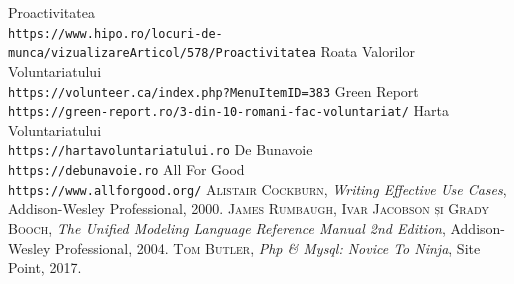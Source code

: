 \documentclass[12pt,a4paper]{report}
\begin{document}
\begin{thebibliography}{1}
Proactivitatea
\\\texttt{https://www.hipo.ro/locuri-de-munca/vizualizareArticol/578/Proactivitatea}
Roata Valorilor Voluntariatului
\\\texttt{https://volunteer.ca/index.php?MenuItemID=383}
Green Report
\\\texttt{https://green-report.ro/3-din-10-romani-fac-voluntariat/}
Harta Voluntariatului
\\\texttt{https://hartavoluntariatului.ro}
De Bunavoie
\\\texttt{https://debunavoie.ro}
All For Good
\\\texttt{https://www.allforgood.org/}
\textsc{Alistair Cockburn}, \emph{Writing Effective Use Cases}, Addison-Wesley Professional, 2000.
\textsc{James Rumbaugh, Ivar Jacobson și Grady Booch}, \emph{The Unified Modeling Language Reference Manual 2nd Edition}, Addison-Wesley Professional, 2004.
\textsc{Tom Butler}, \emph{Php \& Mysql: Novice To Ninja}, Site Point, 2017.

\end{thebibliography}
\end{document}
